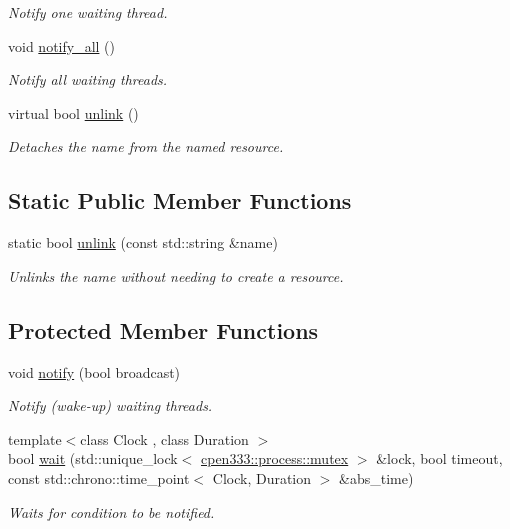 \begin{DoxyCompactItemize}
\begin{DoxyCompactList}\small\item\em Notify one waiting thread. \end{DoxyCompactList}\item 
void \hyperlink{classcpen333_1_1process_1_1condition__base_a37b38d480898c0cc13b0ea1eb2b24127}{notify\+\_\+all} ()
\begin{DoxyCompactList}\small\item\em Notify all waiting threads. \end{DoxyCompactList}\item 
virtual bool \hyperlink{classcpen333_1_1process_1_1condition__base_acd6d0b53a828aa161ccad06885eaa15c}{unlink} ()
\begin{DoxyCompactList}\small\item\em Detaches the name from the named resource. \end{DoxyCompactList}\end{DoxyCompactItemize}
\subsection*{Static Public Member Functions}
\begin{DoxyCompactItemize}
\item 
static bool \hyperlink{classcpen333_1_1process_1_1condition__base_a01ed2d247732584166613527ea8e1aff}{unlink} (const std\+::string \&name)
\begin{DoxyCompactList}\small\item\em Unlinks the name without needing to create a resource. \end{DoxyCompactList}\end{DoxyCompactItemize}
\subsection*{Protected Member Functions}
\begin{DoxyCompactItemize}
\item 
void \hyperlink{classcpen333_1_1process_1_1condition__base_af6f7110f5be9935ac2fbea2b303a2903}{notify} (bool broadcast)
\begin{DoxyCompactList}\small\item\em Notify (wake-\/up) waiting threads. \end{DoxyCompactList}\item 
{\footnotesize template$<$class Clock , class Duration $>$ }\\bool \hyperlink{classcpen333_1_1process_1_1condition__base_a3132db3bcedcddf3a8e5ac24df8d9efa}{wait} (std\+::unique\+\_\+lock$<$ \hyperlink{classcpen333_1_1process_1_1mutex}{cpen333\+::process\+::mutex} $>$ \&lock, bool timeout, const std\+::chrono\+::time\+\_\+point$<$ Clock, Duration $>$ \&abs\+\_\+time)
\begin{DoxyCompactList}\small\item\em Waits for condition to be notified. \end{DoxyCompactList}\end{DoxyCompactItemize}


